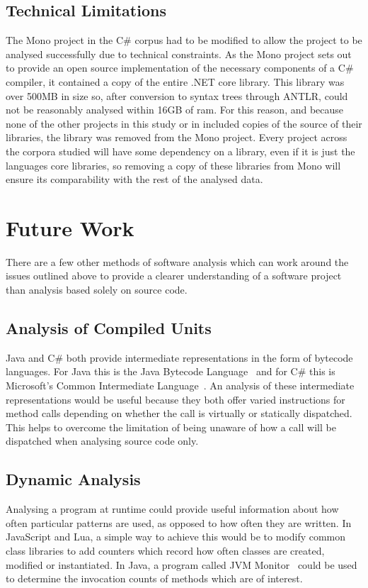 \subsection{Technical Limitations}
The Mono project in the C\# corpus had to be modified to allow the project to be analysed successfully due to technical constraints. As the Mono project sets out to provide an open source implementation of the necessary components of a C\# compiler, it contained a copy of the entire .NET core library. This library was over 500MB in size so, after conversion to syntax trees through ANTLR, could not be reasonably analysed within 16GB of ram. For this reason, and because none of the other projects in this study or in \cite{QualitasCorpus} included copies of the source of their libraries, the library was removed from the Mono project. Every project across the corpora studied will have some dependency on a library, even if it is just the languages core libraries, so removing a copy of these libraries from Mono will ensure its comparability with the rest of the analysed data.

\section{Future Work}
There are a few other methods of software analysis which can work around the issues outlined above to provide a clearer understanding of a software project than analysis based solely on source code.

\subsection{Analysis of Compiled Units}
Java and C\# both provide intermediate representations in the form of bytecode languages. For Java this is the Java Bytecode Language~\cite{JVMSpec} and for C\# this is Microsoft's Common Intermediate Language~\cite{CommonIntermediateLanguage}. An analysis of these intermediate representations would be useful because they both offer varied instructions for method calls depending on whether the call is virtually or statically dispatched. This helps to overcome the limitation of being unaware of how a call will be dispatched when analysing source code only.

\subsection{Dynamic Analysis}
Analysing a program at runtime could provide useful information about how often particular patterns are used, as opposed to how often they are written. In JavaScript and Lua, a simple way to achieve this would be to modify common class libraries to add counters which record how often classes are created, modified or instantiated. In Java, a program called JVM Monitor~\cite{JVMMonitor} could be used to determine the invocation counts of methods which are of interest.